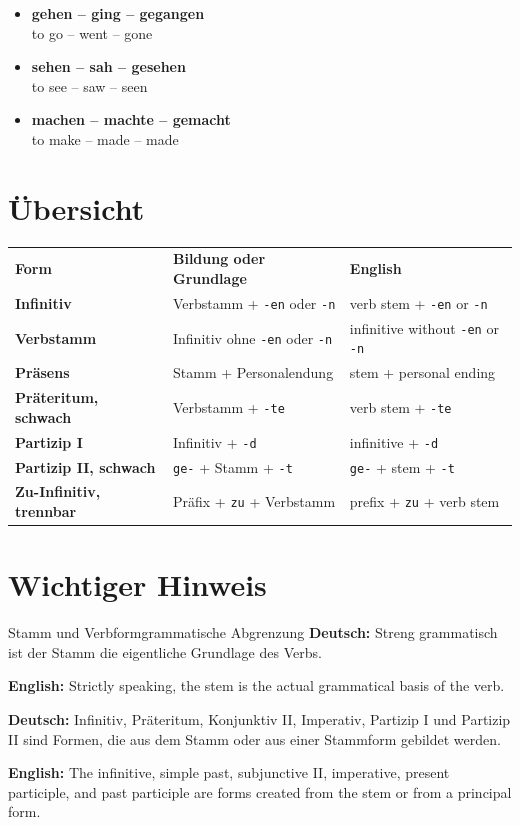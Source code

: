 \documentclass[a4paper,11pt]{article}
\newcommand{\GermanText}[1]{\textbf{Deutsch: }#1\par}
\newcommand{\EnglishText}[1]{{\small\color{SoftGray}\textbf{English: }#1\par}}
\newcommand{\ExampleItem}[2]{\item \textbf{#1}\\{\small\color{SoftGray}#2}}
\begin{document}
        \begin{exbox}
            \begin{itemize}
                \ExampleItem{gehen -- ging -- gegangen}{to go -- went -- gone}
                \ExampleItem{sehen -- sah -- gesehen}{to see -- saw -- seen}
                \ExampleItem{machen -- machte -- gemacht}{to make -- made -- made}
            \end{itemize}
        \end{exbox}

    \section{Übersicht}

        \begin{longtable}{>{\bfseries}p{3.2cm}|p{5.2cm}|p{6.0cm}}
            \rowcolor{HeaderBlueDark}
            \color{white}\textbf{Form} &
            \color{white}\textbf{Bildung oder Grundlage} &
            \color{white}\textbf{English} \\
            Infinitiv & Verbstamm + \texttt{-en} oder \texttt{-n} & verb stem + \texttt{-en} or \texttt{-n} \\
            Verbstamm & Infinitiv ohne \texttt{-en} oder \texttt{-n} & infinitive without \texttt{-en} or \texttt{-n} \\
            Präsens & Stamm + Personalendung & stem + personal ending \\
            Präteritum, schwach & Verbstamm + \texttt{-te} & verb stem + \texttt{-te} \\
            Partizip I & Infinitiv + \texttt{-d} & infinitive + \texttt{-d} \\
            Partizip II, schwach & \texttt{ge-} + Stamm + \texttt{-t} & \texttt{ge-} + stem + \texttt{-t} \\
            Zu-Infinitiv, trennbar & Präfix + \texttt{zu} + Verbstamm & prefix + \texttt{zu} + verb stem \\
        \end{longtable}

    \section{Wichtiger Hinweis}

        \begin{grammarentry}{Stamm und Verbform}{grammatische Abgrenzung}
            \GermanText{Streng grammatisch ist der Stamm die eigentliche Grundlage des Verbs.}
            \EnglishText{Strictly speaking, the stem is the actual grammatical basis of the verb.}

            \GermanText{Infinitiv, Präteritum, Konjunktiv II, Imperativ, Partizip I und Partizip II sind Formen, die aus dem Stamm oder aus einer Stammform gebildet werden.}
            \EnglishText{The infinitive, simple past, subjunctive II, imperative, present participle, and past participle are forms created from the stem or from a principal form.}
        \end{grammarentry}
\end{document}
